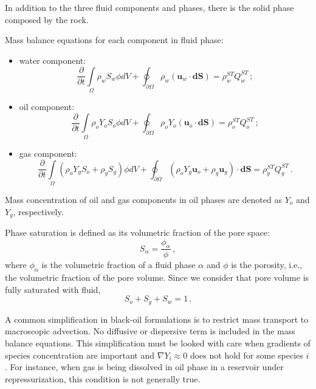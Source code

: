 \documentclass[authoryear,preprint,review,12pt]{elsarticle}
\begin{document}
In addition to the three fluid components and phases, there is the solid phase composed by the rock.

Mass balance equations for each component in fluid phase:

\begin{itemize}
\item water component:
\begin{equation}\label{eq: Sw1}
\frac{\partial}{\partial t} \int\limits_{\Omega} \rho_w S_w \phi dV + \oint_{\partial \Omega} \rho_w \left( \mathbf{u}_w \cdot \mathbf{dS} \right) = \rho_w^{ST}Q_w^{ST} \, ;
\end{equation}

\item oil component:
\begin{equation}\label{eq: So1}
\frac{\partial}{\partial t} \int\limits_{\Omega} \rho_o Y_o S_o \phi dV + \oint_{\partial \Omega} \rho_o Y_o \left(\mathbf{u}_o \cdot \mathbf{dS} \right)= \rho_o^{ST}Q_o^{ST} \, ;
\end{equation}

\item gas component:
\begin{equation}\label{eq: Sg1}
\frac{\partial}{\partial t} \int\limits_{\Omega} \left( \rho_o Y_g S_o + \rho_g S_g\right) \phi dV + \oint_{\partial \Omega} \left( \rho_o Y_g \mathbf{u}_o + \rho_g \mathbf{u}_g\right) \cdot \mathbf{dS}= \rho_g^{ST}Q_g^{ST} \, .
\end{equation}
\end{itemize}
Mass concentration of oil and gas components in oil phases are denoted as $Y_o$ and $Y_g$, respectively.

Phase saturation is defined as its volumetric fraction of the pore space:
\begin{equation}
S_\alpha = \frac{\phi_\alpha}{\phi} \, ,
\end{equation}
where $\phi_\alpha$ is the volumetric fraction of a fluid phase $\alpha$ and $\phi$ is the porosity, i.e., the volumetric fraction of the pore volume. Since we consider that pore volume is fully saturated with fluid,
\begin{equation}
S_o + S_g +S_w = 1 \, .
\end{equation}

A common simplification in black-oil formulations is to restrict mass transport to macroscopic advection. No diffusive or dispersive term is included in the mass balance equations. This simplification must be looked with care when gradients of species concentration are important and $\nabla Y_i \approx 0$ does not hold for some species $i$. For instance, when gas is being dissolved in oil phase in a reservoir under repressurization, this condition is not generally true.
\end{document}
